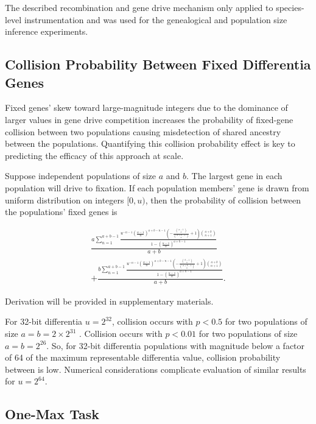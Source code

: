 The described recombination and gene drive mechanism only applied to species-level instrumentation and was used for the genealogical and population size inference experiments.

\subsection{Collision Probability Between Fixed Differentia Genes}
\label{sec:collision-probability}

Fixed genes' skew toward large-magnitude integers due to the dominance of larger values in gene drive competition increases the probability of fixed-gene collision between two populations causing misdetection of shared ancestry between the populations.
Quantifying this collision probability effect is key to predicting the efficacy of this approach at scale.

Suppose independent populations of size $a$ and $b$.
The largest gene in each population will drive to fixation.
If each population members' gene is drawn from uniform distribution on integers $[0, u)$, then the probability of collision between the populations' fixed genes is

\begin{align*}
\frac{a \sum_{n=1}^{a + b - 1} \frac{u^{- n - 1} \left(\frac{u - 1}{u}\right)^{a + b - n - 1} \left(- \frac{{\binom{a - 1}{n}}}{{\binom{a + b - 1}{n}}} + 1\right) {\binom{a + b}{n + 1}}}{1 - \left(\frac{u - 1}{u}\right)^{a + b - 1}}}{a + b} \\
+ \frac{b \sum_{n=1}^{a + b - 1} \frac{u^{- n - 1} \left(\frac{u - 1}{u}\right)^{a + b - n - 1} \left(- \frac{{\binom{b - 1}{n}}}{{\binom{a + b - 1}{n}}} + 1\right) {\binom{a + b}{n + 1}}}{1 - \left(\frac{u - 1}{u}\right)^{a + b - 1}}}{a + b}.
\end{align*}

Derivation will be provided in supplementary materials.

For 32-bit differentia $u = 2^{32}$, collision occurs with $p < 0.5$ for two populations of size $a = b = 2 \times 2^{31}$ .
Collision occurs with $p < 0.01$ for two populations of size $a = b = 2^{26}$.
So, for 32-bit differentia populations with magnitude below a factor of 64 of the maximum representable differentia value, collision probability between is low.
Numerical considerations complicate evaluation of similar results for $u = 2^{64}$.

\subsection{One-Max Task}
\label{sec:one-max}


